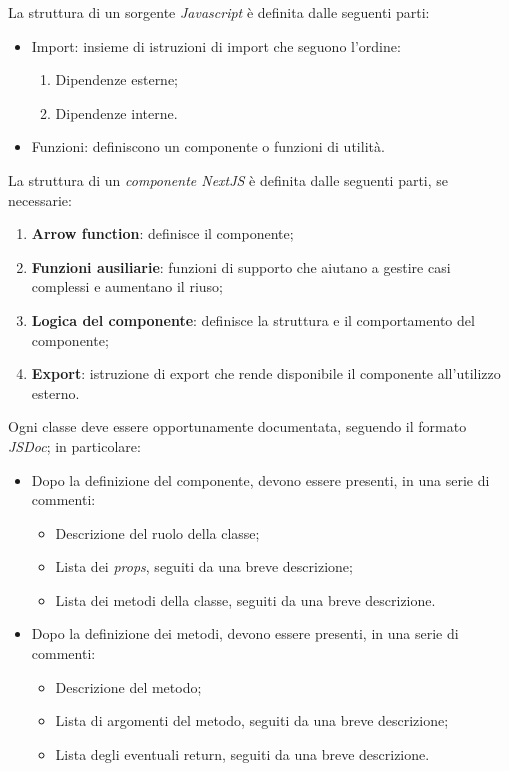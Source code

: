 \documentclass[10pt, a4paper]{article}
\begin{document}
 La struttura di un sorgente \textit{Javascript\pg} è definita dalle seguenti parti:
\begin{itemize}
    \item Import: insieme di istruzioni di import che seguono l'ordine:
    \begin{enumerate}
        \item Dipendenze esterne;
        \item Dipendenze interne.
    \end{enumerate}
    \item Funzioni: definiscono un componente o funzioni di utilità.
\end{itemize}
 La struttura di un \textit{componente NextJS\pg} è definita dalle seguenti parti, se necessarie:
\begin{enumerate}
    \item \textbf{Arrow function}: definisce il componente;
    \item \textbf{Funzioni ausiliarie}: funzioni di supporto che aiutano a gestire casi complessi e aumentano il riuso;
    \item \textbf{Logica del componente}: definisce la struttura e il comportamento del componente;
    \item \textbf{Export}: istruzione di export che rende disponibile il componente all'utilizzo esterno.
\end{enumerate}
Ogni classe deve essere opportunamente documentata, seguendo il formato \textit{JSDoc\pg}; in particolare:
\begin{itemize}
    \item Dopo la definizione del componente, devono essere presenti, in una serie di commenti:
    \begin{itemize}
        \item Descrizione del ruolo della classe;
        \item Lista dei \textit{props\pg}, seguiti da una breve descrizione;
        \item Lista dei metodi della classe, seguiti da una breve descrizione.
    \end{itemize}
    \item Dopo la definizione dei metodi, devono essere presenti, in una serie di commenti:
    \begin{itemize}
        \item Descrizione del metodo;
        \item Lista di argomenti del metodo, seguiti da una breve descrizione;
        \item Lista degli eventuali return, seguiti da una breve descrizione.
    \end{itemize}
\end{itemize}
\end{document}
